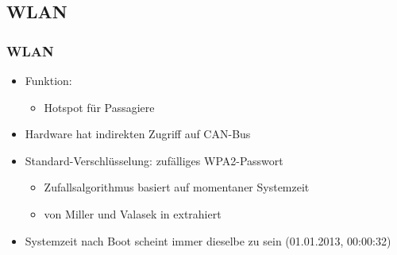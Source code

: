 \documentclass[t]{beamer}
\begin{document}
\subsection{WLAN} %
 \begin{frame}
	\frametitle{WLAN}
    \begin{itemize}
		\item Funktion:
        \begin{itemize}
			\item Hotspot für Passagiere
		\end{itemize}
    \end{itemize}
    \begin{itemize}
		\item Hardware hat indirekten Zugriff auf CAN-Bus
	\end{itemize}
    \begin{itemize}
		\item Standard-Verschlüsselung: zufälliges WPA2-Passwort
		\begin{itemize}
			\item Zufallsalgorithmus basiert auf momentaner Systemzeit %
            \item von Miller und Valasek in \cite{MiV15} extrahiert
		\end{itemize}
	\end{itemize}
    \begin{itemize}
		\item Systemzeit nach Boot scheint immer dieselbe zu sein (01.01.2013, 00:00:32)
        \end{itemize}



\end{frame}

\end{document}
